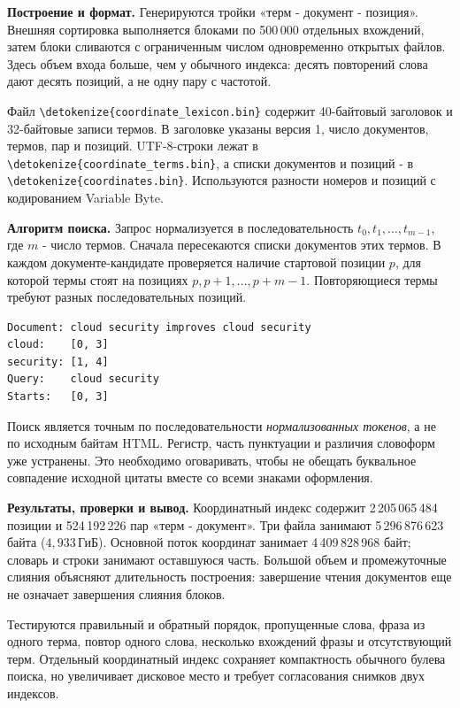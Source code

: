 \documentclass[pdf,unicode,12pt,a4paper,oneside,fleqn]{article}
\newcommand{\partlabel}[1]{\par\Needspace{4\baselineskip}\medskip\textbf{#1.}\quad}
\DeclareRobustCommand{\code}[1]{\expandafter\nolinkurl\expandafter{\detokenize{#1}}}
\newcommand{\GiB}{\,\text{ГиБ}}
\begin{document}
\partlabel{Построение и формат}
Генерируются тройки «терм - документ - позиция». Внешняя сортировка выполняется
блоками по 500\,000 отдельных вхождений, затем блоки сливаются с ограниченным
числом одновременно открытых файлов. Здесь объем входа больше, чем у обычного
индекса: десять повторений слова дают десять позиций, а не одну пару с частотой.

Файл \code{coordinate_lexicon.bin} содержит 40-байтовый заголовок
и 32-байтовые записи термов. В заголовке указаны версия 1, число документов,
термов, пар и позиций. UTF-8-строки лежат в \code{coordinate_terms.bin},
а списки документов и позиций - в \code{coordinates.bin}. Используются
разности номеров и позиций с кодированием Variable Byte.

\partlabel{Алгоритм поиска}
Запрос нормализуется в последовательность $t_0,t_1,\ldots,t_{m-1}$,
где $m$ - число термов. Сначала пересекаются списки документов этих термов.
В каждом документе-кандидате проверяется наличие стартовой позиции $p$,
для которой термы стоят на позициях $p,p+1,\ldots,p+m-1$.
Повторяющиеся термы требуют разных последовательных позиций.

\begin{lstlisting}
Document: cloud security improves cloud security
cloud:    [0, 3]
security: [1, 4]
Query:    cloud security
Starts:   [0, 3]
\end{lstlisting}

Поиск является точным по последовательности \emph{нормализованных токенов},
а не по исходным байтам HTML. Регистр, часть пунктуации и различия словоформ
уже устранены. Это необходимо оговаривать, чтобы не обещать буквальное
совпадение исходной цитаты вместе со всеми знаками оформления.

\partlabel{Результаты, проверки и вывод}
Координатный индекс содержит 2\,205\,065\,484 позиции
и 524\,192\,226 пар «терм - документ». Три файла занимают
5\,296\,876\,623 байта ($4{,}933\GiB$). Основной поток координат
занимает 4\,409\,828\,968 байт; словарь и строки занимают оставшуюся часть.
Большой объем и промежуточные слияния объясняют длительность построения:
завершение чтения документов еще не означает завершения слияния блоков.

Тестируются правильный и обратный порядок, пропущенные слова, фраза из одного
терма, повтор одного слова, несколько вхождений фразы и отсутствующий терм.
Отдельный координатный индекс сохраняет компактность обычного булева поиска,
но увеличивает дисковое место и требует согласования снимков двух индексов.
\end{document}
